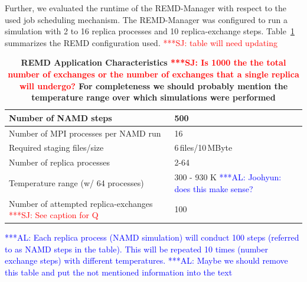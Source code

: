 \documentclass{rspublic}
\newcommand{\alnote}[1]{ {\textcolor{blue} { ***AL: #1 }}}
\newcommand{\jhanote}[1]{ {\textcolor{red} { ***SJ: #1 }}}
\newcommand{\alnote}[1]{}
\newcommand{\jhanote}[1]{}
\begin{document}
Further, we evaluated the runtime of the REMD-Manager with respect to the 
used job scheduling mechanism. The REMD-Manager was configured to run 
a simulation with 2 to 16 replica processes and 10 replica-exchange steps. 
Table~\ref{tab:app_stats} summarizes the REMD configuration used. 
\jhanote{table will need updating}
\begin{table}
    \centering
	\begin{tabular}{|p{5cm}|l|}
          \hline
          Number of NAMD steps &500\\ \hline 
          Number of MPI processes per NAMD run &16\\ \hline 
          Required staging files/size &6\,files/10\,MByte\\ \hline
          Number of replica processes &2-64 \\ \hline   
          Temperature range (w/ 64 processes) &300 - 930 K \alnote{Joohyun: does this make sense?} \\ \hline
          Number of attempted replica-exchanges \jhanote{See caption for Q} &100\\ \hline
	\end{tabular}
	\caption{\footnotesize \bf REMD Application Characteristics\label{tab:app_stats}
          \jhanote{Is 1000 the the total number of exchanges or the
            number of exchanges that a single replica will undergo?}
          For completeness we should probably mention the temperature
          range over which simulations were performed}
          \alnote{Each replica process (NAMD simulation) will conduct 
          100 steps (referred to as NAMD steps in the table). This 
          will be repeated 10 times (number exchange steps) with 
          different temperatures.}         
          \alnote{Maybe we should remove this table and put the not mentioned information 
          into the text}
          
\end{table}  
 
\end{document}
